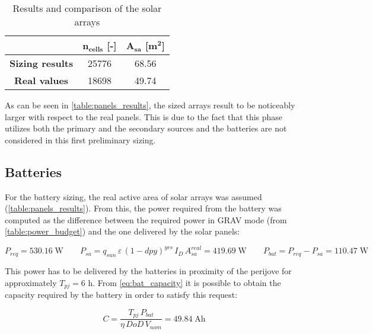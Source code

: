 \begin{table}[H]
    \renewcommand{\arraystretch}{1.3}
    \centering
    \small
    \begin{tabular}{|c|c|c|}
        \hline
        & $\boldsymbol{n_{cells}}$ \textbf{[-]} &
        $\boldsymbol{A_{sa}}$ \textbf{[$\boldsymbol{\textbf{m}^2}$]} \\
        \hline
        \textbf{Sizing results} & 25776 & 68.56 \\
        \hline
        \textbf{Real values}\cite{masses_ref} & 18698 & 49.74 \\
        \hline
    \end{tabular}
    \caption{Results and comparison of the solar arrays}
    \label{table:panels_results}
\end{table}
\vspace*{-3mm}

As can be seen in \autoref{table:panels_results}, the sized arrays result to be noticeably larger with respect to the real panels.
This is due to the fact that this phase utilizes both the primary and the secondary sources and the batteries are not considered in this first preliminary sizing.
\vspace{-1mm}

\subsection{Batteries}
\label{subsec:battery_sizing}

For the battery sizing, the real active area of solar arrays was assumed (\autoref{table:panels_results}).
From this, the power required from the battery was computed as the difference between the required power in GRAV mode (from \autoref{table:power_budget}) and the one delivered by the solar panels:

\begin{equation}
    P_{req} = 530.16 \; \textrm{W} \qquad
    P_{sa} = q_{sun} \, \varepsilon \, \left( 1 - dpy \right) ^ {yrs} \, I_D \, A_{sa}^{real} = 419.69 \; \textrm{W} \qquad
    P_{bat} = P_{req} - P_{sa} = 110.47 \; \textrm{W}
\end{equation}

This power has to be delivered by the batteries in proximity of the perijove for approximately $T_{pj} = 6$ h. From \autoref{eq:bat_capacity} it is possible to obtain the capacity required by the battery in order to satisfy this request:

\begin{equation}
    C = \frac{T_{pj} \, P_{bat}}{\eta \, DoD \, V_{nom}} = 49.84 \; \textrm{Ah}
    \label{eq:bat_capacity}
\end{equation}


